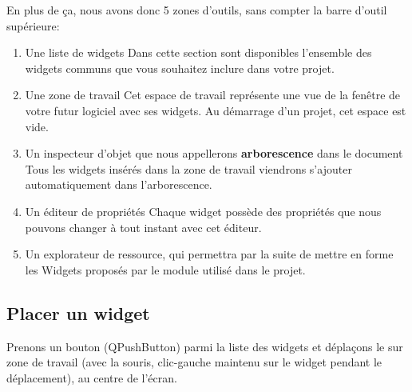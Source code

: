 En plus de ça, nous avons donc 5 zones d'outils, sans compter la barre d'outil supérieure: 

\begin{enumerate}

    \item {\color{green}Une liste de widgets}
    Dans cette section sont disponibles l'ensemble des widgets communs que vous souhaitez inclure dans votre projet.

    \item {\color{blue}Une zone de travail}
    Cet espace de travail représente une vue de la fenêtre de votre futur logiciel avec ses widgets. \newline
    Au démarrage d'un projet, cet espace est vide.


    \item {\color{red}Un inspecteur d'objet que nous appellerons \textbf{arborescence} dans le document}
    Tous les widgets insérés dans la zone de travail viendrons s'ajouter automatiquement dans l'arborescence.

    
    \item {\color{magenta}Un éditeur de propriétés}
    Chaque widget possède des propriétés que nous pouvons changer à tout instant avec cet éditeur.

    \item {\color{gray}Un explorateur de ressource}, qui permettra par la suite de mettre en forme les Widgets proposés par le module  utilisé dans le projet.
    
\end{enumerate}


\subsection{Placer un widget}


Prenons un bouton (QPushButton) parmi la {\color{green}liste des widgets} et déplaçons le sur {\color{blue}zone de travail} (avec la souris, clic-gauche maintenu sur le widget pendant le déplacement), au centre de l'écran.




